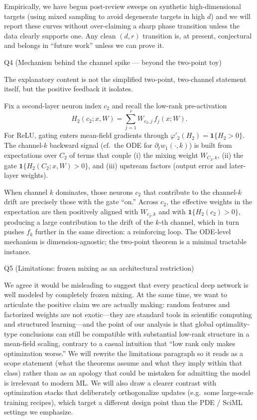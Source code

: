 Empirically, we have begun post-review sweeps on synthetic high-dimensional targets (using mixed sampling to avoid degenerate targets in high $d$) and we will report these curves without over-claiming a sharp phase transition unless the data clearly supports one. Any clean $(d,r)$ transition is, at present, conjectural and belongs in ``future work'' unless we can prove it.

Q4 (Mechanism behind the channel spike --- beyond the two-point toy)

The explanatory content is not the simplified two-point, two-channel statement itself, but the positive feedback it isolates.

Fix a second-layer neuron index $c_2$ and recall the low-rank pre-activation
$$
H_2(c_2;x,W)=\sum_{j=1}^r W_{c_2,j}\,f_j(x;W).
$$
For ReLU, gating enters mean-field gradients through $\varphi'_2(H_2)=\mathbf{1}\{H_2>0\}$. The channel-$k$ backward signal (cf.\ the ODE for $\partial_t w_1(\cdot,k)$) is built from expectations over $C_2$ of terms that couple (i) the mixing weight $W_{C_2,k}$, (ii) the gate $\mathbf{1}\{H_2(C_2;x,W)>0\}$, and (iii) upstream factors (output error and later-layer weights).

When channel $k$ dominates, those neurons $c_2$ that contribute to the channel-$k$ drift are precisely those with the gate ``on.'' Across $c_2$, the effective weights in the expectation are then positively aligned with $W_{c_2,k}$ and with $\mathbf{1}\{H_2(c_2)>0\}$, producing a large contribution to the drift of the $k$-th channel, which in turn pushes $f_k$ further in the same direction: a reinforcing loop. The ODE-level mechanism is dimension-agnostic; the two-point theorem is a minimal tractable instance.

Q5 (Limitations: frozen mixing as an architectural restriction)

We agree it would be misleading to suggest that every practical deep network is well modeled by completely frozen mixing. At the same time, we want to articulate the positive claim we are actually making: random features and factorized weights are not exotic---they are standard tools in scientific computing and structured learning---and the point of our analysis is that global optimality-type conclusions can still be compatible with substantial low-rank structure in a mean-field scaling, contrary to a casual intuition that ``low rank only makes optimization worse.'' We will rewrite the limitations paragraph so it reads as a scope statement (what the theorems assume and what they imply within that class) rather than as an apology that could be mistaken for admitting the model is irrelevant to modern ML. We will also draw a clearer contrast with optimization stacks that deliberately orthogonalize updates (e.g.\ some large-scale training recipes), which target a different design point than the PDE / SciML settings we emphasize.
